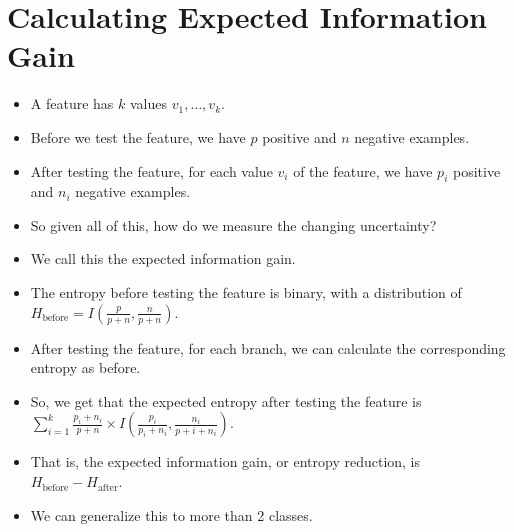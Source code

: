 \documentclass{article}
\begin{document}
\section{Calculating Expected Information Gain}
\begin{itemize}
    \item A feature has $k$ values $v_1, \dots, v_k$.
    \item Before we test the feature, we have $p$ positive and $n$ negative examples.
    \item After testing the feature, for each value $v_i$ of the feature, we have $p_i$ positive and $n_i$ negative examples.
    \item So given all of this, how do we measure the changing uncertainty?
    \item We call this the expected information gain.
    \item The entropy before testing the feature is binary, with a distribution of $H_{\text{before}} = I(\frac{p}{p + n}, \frac{n}{p + n})$.
    \item After testing the feature, for each branch, we can calculate the corresponding entropy as before.
    \item So, we get that the expected entropy after testing the feature is $\sum_{i = 1}^k \frac{p_i + n_i}{p + n} \times I(\frac{p_i}{p_i + n_i}, \frac{n_i}{p+i + n_i})$.
    \item That is, the expected information gain, or entropy reduction, is $H_\text{before} - H_\text{after}$.
    \item We can generalize this to more than 2 classes.
\end{itemize}
\end{document}
